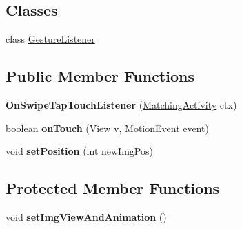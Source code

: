 \subsection*{Classes}
\begin{DoxyCompactItemize}
\item 
class \hyperlink{classcom_1_1example_1_1sebastian_1_1tindertp_1_1gestureTools_1_1OnSwipeTapTouchListener_1_1GestureListener}{Gesture\+Listener}
\end{DoxyCompactItemize}
\subsection*{Public Member Functions}
\begin{DoxyCompactItemize}
\item 
{\bfseries On\+Swipe\+Tap\+Touch\+Listener} (\hyperlink{classcom_1_1example_1_1sebastian_1_1tindertp_1_1MatchingActivity}{Matching\+Activity} ctx)\hypertarget{classcom_1_1example_1_1sebastian_1_1tindertp_1_1gestureTools_1_1OnSwipeTapTouchListener_a8e4f82f6a981a540082f597e87d577d9}{}\label{classcom_1_1example_1_1sebastian_1_1tindertp_1_1gestureTools_1_1OnSwipeTapTouchListener_a8e4f82f6a981a540082f597e87d577d9}

\item 
boolean {\bfseries on\+Touch} (View v, Motion\+Event event)\hypertarget{classcom_1_1example_1_1sebastian_1_1tindertp_1_1gestureTools_1_1OnSwipeTapTouchListener_ac394faaf38a347b78425d0a879910452}{}\label{classcom_1_1example_1_1sebastian_1_1tindertp_1_1gestureTools_1_1OnSwipeTapTouchListener_ac394faaf38a347b78425d0a879910452}

\item 
void {\bfseries set\+Position} (int new\+Img\+Pos)\hypertarget{classcom_1_1example_1_1sebastian_1_1tindertp_1_1gestureTools_1_1OnSwipeTapTouchListener_ab2f041cb6bee7956d24e1bb9b743ee55}{}\label{classcom_1_1example_1_1sebastian_1_1tindertp_1_1gestureTools_1_1OnSwipeTapTouchListener_ab2f041cb6bee7956d24e1bb9b743ee55}

\end{DoxyCompactItemize}
\subsection*{Protected Member Functions}
\begin{DoxyCompactItemize}
\item 
void {\bfseries set\+Img\+View\+And\+Animation} ()\hypertarget{classcom_1_1example_1_1sebastian_1_1tindertp_1_1gestureTools_1_1OnSwipeTapTouchListener_ac7c0f412be5d04b2defb3b13af7d4b75}{}\label{classcom_1_1example_1_1sebastian_1_1tindertp_1_1gestureTools_1_1OnSwipeTapTouchListener_ac7c0f412be5d04b2defb3b13af7d4b75}

\end{DoxyCompactItemize}
